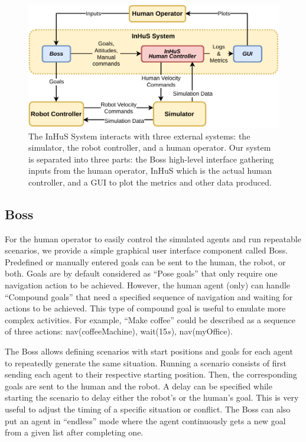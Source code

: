 \begin{figure}[ht]
    \centering
    \includegraphics[width=0.7\linewidth]{images/Chapter6/Inhus.drawio.pdf}
    \caption{
    The InHuS System interacts with three external systems: the simulator, the robot controller, and a human operator. Our system is separated into three parts: the Boss high-level interface gathering inputs from the human operator, InHuS which is the actual human controller, and a GUI to plot the metrics and other data produced.
    }
    \label{fig:overview}
    \vspace{-0.8cm}
\end{figure}

\subsection{Boss}
For the human operator to easily control the simulated agents and run repeatable scenarios, we provide a simple graphical user interface component called Boss. Predefined or manually entered goals can be sent to the human, the robot, or both. Goals are by default considered as ``Pose goals'' that only require one navigation action to be achieved. However, the human agent (only) can handle ``Compound goals'' that need a specified sequence of navigation and waiting for actions to be achieved. This type of compound goal is useful to emulate more complex activities. For example, ``Make coffee'' could be described as a sequence of three actions: nav(coffeeMachine), wait(15$s$), nav(myOffice).

The Boss allows defining scenarios with start positions and goals for each agent to repeatedly generate the same situation. 
Running a scenario consists of first sending each agent to their respective starting position. Then, the corresponding goals are sent to the human and the robot.
A delay can be specified while starting the scenario to delay either the robot's or the human's goal. This is very useful to adjust the timing of a specific situation or conflict. The Boss can also put an agent in ``endless'' mode where the agent continuously gets a new goal from a given list after completing one. 

